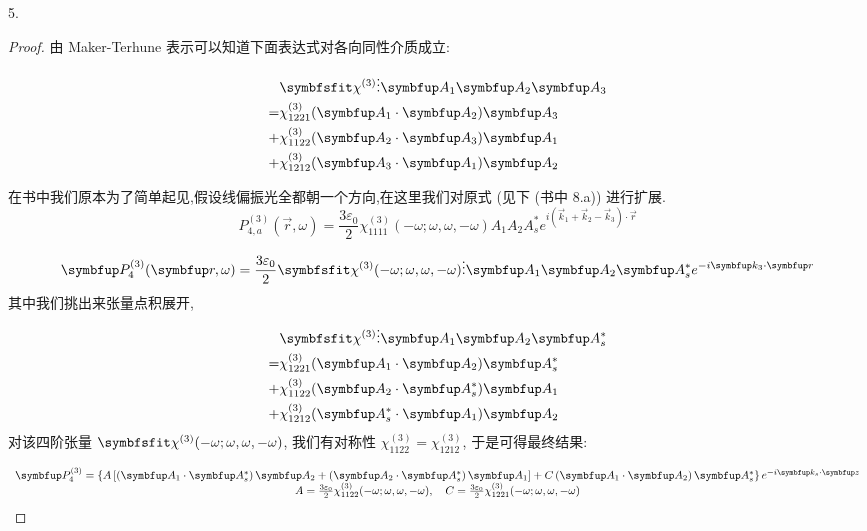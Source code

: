 \begin{exercise}
5. 
\end{exercise}

\begin{proof}
由 Maker-Terhune 表示可以知道下面表达式对各向同性介质成立:

$$
\begin{aligned}
&\Tens{\chi}^{(3)} \vdots \Vect{A_{1}} \Vect{A_{2}} \Vect{A_{3}}\\
=&\chi_{1221}^{(3)}(\Vect{A_{1}} \cdot \Vect{A_{2}}) \Vect{A_{3}}\\
+&\chi_{1122}^{(3)}(\Vect{A_{2}} \cdot\Vect{A_{3}}) \Vect{A_{1}}\\
+&\chi_{1212}^{(3)}(\Vect{A_{3}}\cdot\Vect{A_{1}}) \Vect{A_{2}}
\end{aligned}
$$




在书中我们原本为了简单起见,假设线偏振光全都朝一个方向,在这里我们对原式 (见下 (书中 8.a)) 进行扩展.
$$
P_{4, a}^{(3)}(\vec{r}, \omega)=\frac{3 \varepsilon_{0}}{2} \chi_{1111}^{(3)}(-\omega ; \omega, \omega,-\omega) A_{1} A_{2} A_{s}^{*} e^{i\left(\vec{k}_{1}+\vec{k}_{2}-\vec{k}_{3}\right) \cdot \vec{r}}
$$

$$
\Vect{P}_{4}^{(3)}(\Vect{r}, \omega)
=\frac{3 \varepsilon_{0}}{2} \Tens{\chi}^{(3)}(-\omega ; \omega, \omega,-\omega)
\vdots \Vect{A}_{1} \Vect{A}_{2} \Vect{A}_{s}^{*} e^{-i\Vect{k}_{3}\cdot \Vect{r}}
$$
其中我们挑出来张量点积展开,
$$
\begin{aligned}
&\Tens{\chi}^{(3)} \vdots \Vect{A_{1}} \Vect{A_{2}} \Vect{A_{s}^{*}}\\
=&\chi_{1221}^{(3)}(\Vect{A_{1}} \cdot \Vect{A_{2}}) \Vect{A_{s}^{*}}\\
+&\chi_{1122}^{(3)}(\Vect{A_{2}} \cdot\Vect{A_{s}^{*}}) \Vect{A_{1}}\\
+&\chi_{1212}^{(3)}(\Vect{A_{s}^{*}}\cdot\Vect{A_{1}}) \Vect{A_{2}}
\end{aligned}
$$
对该四阶张量 $\Tens{\chi}^{(3)}(-\omega ; \omega, \omega,-\omega)$, 我们有对称性 $\chi_{1122}^{(3)}=\chi_{1212}^{(3)}$, 于是可得最终结果:

$$
\begin{array}{c}
{\Vect{P}_{4}^{(3)}=\left\{A\left[\left(\Vect{A}_{1} \cdot \Vect{A}_{s}^{*}\right) \Vect{A}_{2}+\left(\Vect{A}_{2} \cdot \Vect{A}_{s}^{*}\right) \Vect{A}_{1}\right]+C\left(\Vect{A}_{1} \cdot \Vect{A}_{2}\right) \Vect{A}_{s}^{*}\right\} e^{-i \Vect{k}_{s} \cdot\Vect{z}}} \\
{A=\frac{3 \varepsilon_{0}}{2} \chi_{1122}^{(3)}(-\omega ; \omega, \omega,-\omega), \quad C=\frac{3 \varepsilon_{0}}{2} \chi_{1221}^{(3)}(-\omega ; \omega, \omega,-\omega)}
\end{array}
$$
\end{proof}

